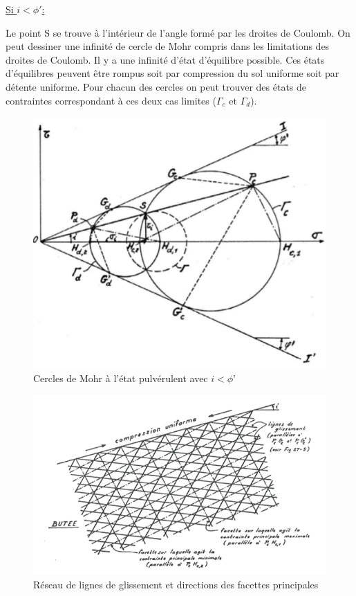             \underline{Si $i < \phi'$:} 
            
            Le point S se trouve à l'intérieur de l'angle formé par les droites de Coulomb. On peut dessiner une infinité de cercle de Mohr compris dans les limitations des droites de Coulomb. Il y a une infinité d'état d'équilibre possible.
            Ces états d'équilibres peuvent être rompus soit par compression du sol uniforme soit par détente uniforme. Pour chacun des cercles on peut trouver des états de contraintes correspondant à ces deux cas limites ($\Gamma_c$ et $\Gamma_d$). 
            
                \begin{figure}[h!]
                \includegraphics[scale=0.6]{Holeyman/images/H8.PNG}
                \caption{Cercles de Mohr à l’état pulvérulent avec $i < \phi’$ }
                \end{figure}
                
                \begin{figure}[h!]
                \includegraphics[scale=0.6]{Holeyman/images/H9.PNG}
                \caption{Réseau de lignes de glissement et directions des facettes principales}
                \end{figure}
            
